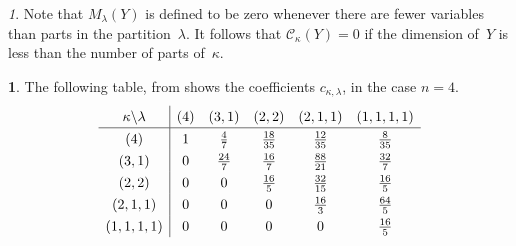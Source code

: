 \documentclass{mathincs}
\numberwithin{equation}{section}
\numberwithin{figure}{section}
\theoremstyle{plain}
\theoremstyle{definition}
\theoremstyle{remark}
\newtheorem{rem}[thm]{\protect\remarkname}
\theoremstyle{plain}
\theoremstyle{definition}
\newtheorem{example}[thm]{\protect\examplename}
\theoremstyle{plain}
\theoremstyle{plain}
\providecommand{\examplename}{Example}
\providecommand{\remarkname}{Remark}
\begin{document}
\begin{rem}\label{rem:polyzero}
  Note that $M_\lambda(Y)$ is defined to be zero whenever there are fewer
  variables than parts in the partition~$\lambda$. It follows that
  $\mathcal{C}_{\kappa}(Y)=0$ if the dimension of~$Y$ is less than the
  number of parts of~$\kappa$.
\end{rem}
\begin{example}\label{Tables}
The following table, from \cite[p.~238]{Muirhead} shows
the coefficients $c_{\kappa,\lambda}$, in the case $n=4$.
\[
\def\arraystretch{1.3}
\begin{array}{c|ccccc}
\kappa\backslash\lambda & \left(4\right) & \left(3,1\right) & \left(2,2\right) & \left(2,1,1\right) & \left(1,1,1,1\right)\\ \hline
\left(4\right) & 1 & \frac{4}{7} & \frac{18}{35} & \frac{12}{35} & \frac{8}{35}\\
\left(3,1\right) & 0 & \frac{24}{7} & \frac{16}{7} & \frac{88}{21} & \frac{32}{7}\\
\left(2,2\right) & 0 & 0 & \frac{16}{5} & \frac{32}{15} & \frac{16}{5}\\
\left(2,1,1\right) & 0 & 0 & 0 & \frac{16}{3} & \frac{64}{5}\\
\left(1,1,1,1\right) & 0 & 0 & 0 & 0 & \frac{16}{5}
\end{array}
\]

\end{example}
\end{document}
